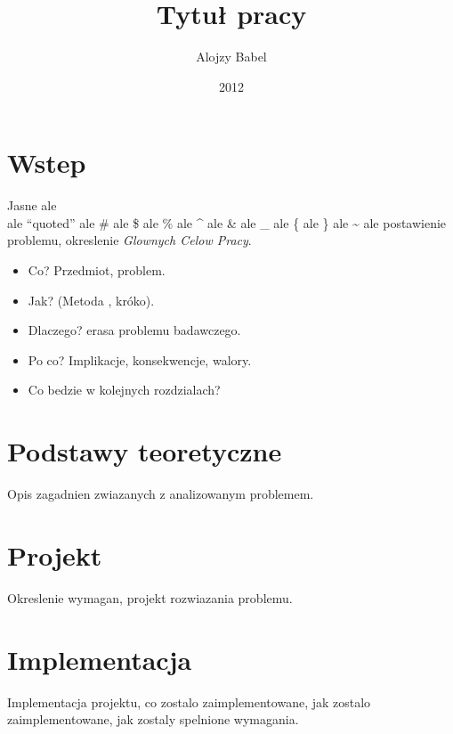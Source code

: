 \documentclass[14pt]{article}
\title{Tytuł pracy}
\author{Alojzy Babel}
\date{2012}
\begin{document}
\maketitle


\section{Wstep}
Jasne ale \\ ale ``quoted'' ale \# ale \$ ale \% ale \^{} ale \& ale \_ ale \{ ale \} ale \~{} ale postawienie problemu, okreslenie \emph{Glownych Celow Pracy}.

\begin{itemize}
sdfsdfsdf
\item Co? Przedmiot, problem.

\item Jak? (Metoda , króko).

\item Dlaczego? erasa problemu badawczego.

\item Po co? Implikacje, konsekwencje, walory.

\item  Co bedzie w kolejnych rozdzialach?
\end{itemize}


\section{Podstawy teoretyczne}
Opis zagadnien zwiazanych z analizowanym problemem.

\section{Projekt}
 Okreslenie wymagan, projekt rozwiazania problemu.

\section{Implementacja}

Implementacja projektu, co zostalo zaimplementowane, jak zostalo zaimplementowane, jak zostaly spelnione wymagania.
\end{document}
